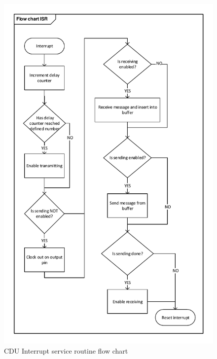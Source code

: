\begin{figure}[H]
\centering
\includegraphics[width=1\textwidth]{billeder/isrflowchart}
\caption{CDU Interrupt service routine flow chart}
\label{fig:isrflowchart}
\end{figure}

